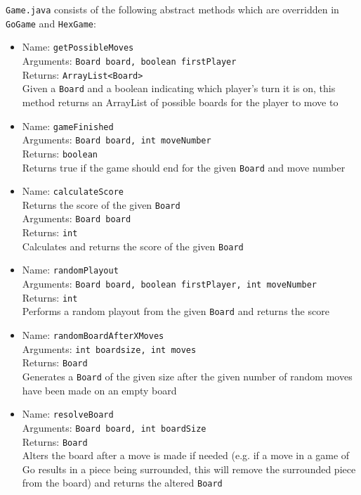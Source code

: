 \texttt{Game.java} consists of the following abstract methods which are overridden in \texttt{GoGame} and \texttt{HexGame}:
\begin{itemize}
\item Name: \texttt{getPossibleMoves}\\
Arguments: \texttt{Board board, boolean firstPlayer}\\
Returns: \texttt{ArrayList<Board>}\\
Given a \texttt{Board} and a boolean indicating which player's turn it is on, this method returns an ArrayList of possible boards for the player to move to

\item Name: \texttt{gameFinished}\\
Arguments: \texttt{Board board, int moveNumber}\\
Returns: \texttt{boolean}\\
Returns true if the game should end for the given \texttt{Board} and move number

\item Name: \texttt{calculateScore}\\
Returns the score of the given \texttt{Board}\\
Arguments: \texttt{Board board}\\
Returns: \texttt{int}\\
Calculates and returns the score of the given \texttt{Board}

\item Name: \texttt{randomPlayout}\\
Arguments: \texttt{Board board, boolean firstPlayer, int moveNumber}\\
Returns: \texttt{int}\\
Performs a random playout from the given \texttt{Board} and returns the score

\item Name: \texttt{randomBoardAfterXMoves}\\
Arguments: \texttt{int boardsize, int moves}\\
Returns: \texttt{Board}\\
Generates a \texttt{Board} of the given size after the given number of random moves have been made on an empty board

\item Name: \texttt{resolveBoard}\\
Arguments: \texttt{Board board, int boardSize}\\
Returns: \texttt{Board}\\
Alters the board after a move is made if needed (e.g. if a move in a game of Go results in a piece being surrounded, this will remove the surrounded piece from the board) and returns the altered \texttt{Board}
\end{itemize}

